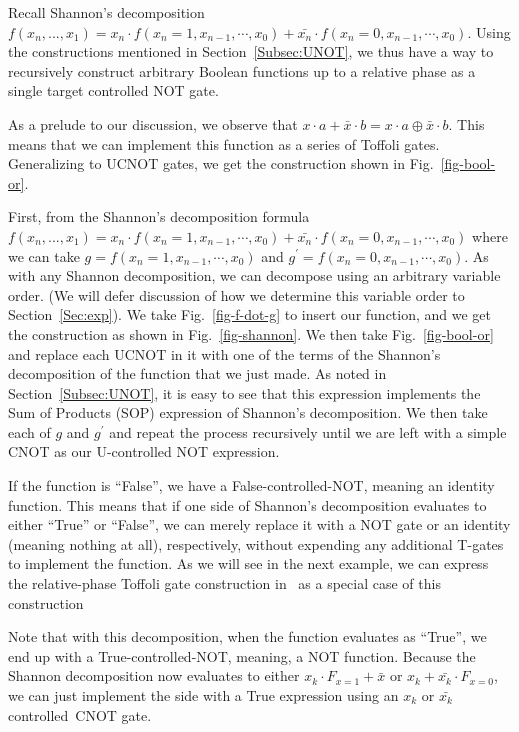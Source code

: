 Recall Shannon's decomposition $f(x_n,...,x_1) = x_n \cdot f(x_n=1,x_{n-1},\cdots,x_0) + \bar{x_n} \cdot f(x_n=0,x_{n-1},\cdots,x_0)$. Using the constructions mentioned in Section~\ref{Subsec:UNOT}, we thus have a way to recursively construct arbitrary Boolean functions up to a relative phase as a single target controlled NOT gate.

As a prelude to our discussion, we observe that $x \cdot a  + \bar{x} \cdot b = x \cdot a \oplus \bar{x} \cdot b$. This means that we can implement this function as a series of Toffoli gates. Generalizing to UCNOT gates, we get the construction shown in Fig.~\ref{fig-bool-or}.

First, from the Shannon's decomposition formula~$f(x_n,...,x_1) = x_n \cdot f(x_n=1,x_{n-1},\cdots,x_0) + \bar{x_n} \cdot f(x_n=0,x_{n-1},\cdots,x_0)$ where we can take $g=f(x_n=1,x_{n-1},\cdots,x_0)$ and $g^{\prime}=f(x_n=0,x_{n-1},\cdots,x_0)$. As with any Shannon decomposition, we can decompose using an arbitrary variable order. (We will defer discussion of how we determine this variable order to Section~\ref{Sec:exp}). We take Fig.~\ref{fig-f-dot-g} to insert our function, and we get the construction as shown in Fig.~\ref{fig-shannon}. We then take Fig.~\ref{fig-bool-or} and replace each UCNOT in it with one of the terms of the Shannon's decomposition of the function that we just made. As noted in Section~\ref{Subsec:UNOT}, it is easy to see that this expression implements the Sum of Products (SOP) expression of Shannon's decomposition. We then take each of $g$ and $g^{\prime}$ and repeat the process recursively until we are left with a simple CNOT as our U-controlled NOT expression.

If the function is ``False'', we have a False-controlled-NOT, meaning an identity function. This means that if one side of Shannon's decomposition evaluates to either ``True'' or ``False'', we can merely replace it with a NOT gate or an identity (meaning nothing at all), respectively, without expending any additional T-gates to implement the function. As we will see in the next example, we can express the relative-phase Toffoli gate construction in~\cite{bib-amy-phase-state} as a special case of this construction

Note that with this decomposition, when the function evaluates as ``True'', we end up with a True-controlled-NOT, meaning, a NOT function. Because the Shannon decomposition now evaluates to either $x_k \cdot F_{x=1} + \bar{x}$ or $x_k + \bar{x_k} \cdot F_{x=0}$, we can just implement the side with a True expression using an $x_k$ or $\bar{x_k}$ controlled~CNOT gate. 

